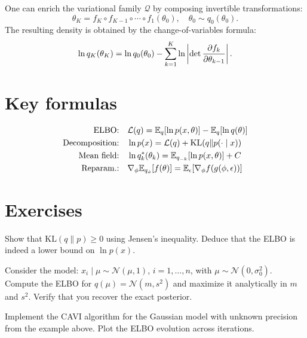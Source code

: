 One can enrich the variational family $\mathcal{Q}$ by composing
invertible transformations:
\[
  \theta_K = f_K \circ f_{K-1} \circ \cdots \circ f_1(\theta_0),
  \quad \theta_0 \sim q_0(\theta_0).
\]
The resulting density is obtained by the change-of-variables formula:
\[
  \ln q_K(\theta_K) = \ln q_0(\theta_0)
  - \sum_{k=1}^K \ln \left| \det \frac{\partial f_k}{\partial \theta_{k-1}} \right|.
\]

\section{Key formulas}

\begin{keyformulas}
\begin{align}
  \text{ELBO:} \quad & \mathcal{L}(q) = \mathbb{E}_q[\ln p(x,\theta)] - \mathbb{E}_q[\ln q(\theta)] \\
  \text{Decomposition:} \quad & \ln p(x) = \mathcal{L}(q) + \mathrm{KL}(q \| p(\cdot \mid x)) \\
  \text{Mean field:} \quad & \ln q_k^*(\theta_k) = \mathbb{E}_{q_{-k}}[\ln p(x,\theta)] + C \\
  \text{Reparam.:} \quad & \nabla_\phi \mathbb{E}_{q_\phi}[f(\theta)]
    = \mathbb{E}_\epsilon[\nabla_\phi f(g(\phi,\epsilon))]
\end{align}
\end{keyformulas}

\section{Exercises}

\begin{exercise}
Show that $\mathrm{KL}(q \| p) \geq 0$ using Jensen's inequality.
Deduce that the ELBO is indeed a lower bound on $\ln p(x)$.
\end{exercise}

\begin{exercise}
Consider the model: $x_i \mid \mu \sim \mathcal{N}(\mu, 1)$, $i=1,\ldots,n$,
with $\mu \sim \mathcal{N}(0, \sigma_0^2)$. Compute the ELBO for
$q(\mu) = \mathcal{N}(m, s^2)$ and maximize it analytically in $m$ and $s^2$.
Verify that you recover the exact posterior.
\end{exercise}

\begin{exercise}
Implement the CAVI algorithm for the Gaussian model with unknown precision
from the example above. Plot the ELBO evolution across iterations.
\end{exercise}

